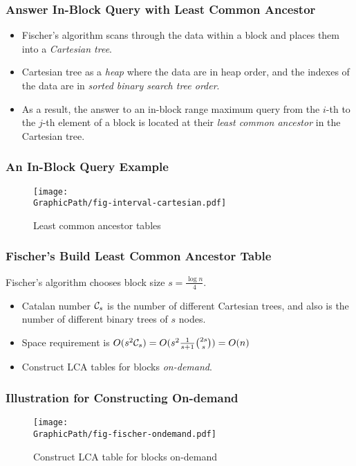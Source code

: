 \begin{frame}
	\frametitle{Answer In-Block Query with Least Common Ancestor}
	\begin{itemize}
		\setlength\itemsep{1em}
		\item
			Fischer's algorithm scans through the data within a block
			and places them into a {\em Cartesian tree}.
		\item
			Cartesian tree as a {\em heap} where the data are in heap
			order, and the indexes of the data are in {\em sorted binary
			search tree order}.
		\item 
			As a result, the answer to an in-block range maximum query
			from the $i$-th to the $j$-th element of a block is located
			at their {\em least common ancestor} in the Cartesian tree.
	\end{itemize}
\end{frame}

\begin{frame}
	\frametitle{An In-Block Query Example}
	\begin{figure}[htbp]   
	  \centering
	  \texttt{[image: \\GraphicPath/fig-interval-cartesian.pdf]}
	  \caption{Least common ancestor tables}
	  \label{fig:ancesstor-cartesian}
	\end{figure}
\end{frame}

\begin{frame}
	\frametitle{Fischer's Build Least Common Ancestor Table}
	Fischer's algorithm chooses block size $s=\frac{\log n}{4}$.
	\begin{itemize}
		\setlength\itemsep{1em}
		\item 
			Catalan number ${\cal C}_s$ is the number of different Cartesian
			trees, and also is the number of different binary trees of
			$s$ nodes.
		\item
			Space requirement is
			$O(s^2{\cal C}_s)=O(s^2\frac{1}{s+1}\binom{2s}{s})=O(n)$
		\item
			Construct LCA tables for blocks {\em on-demand}.
	\end{itemize}
\end{frame}

\begin{withoutheadline}
\begin{frame}
	\frametitle{Illustration for Constructing On-demand}
	\begin{figure}[htbp]   
	  \centering
	  \texttt{[image: \\GraphicPath/fig-fischer-ondemand.pdf]}
	  \caption{Construct LCA table for blocks on-demand}
	  \label{fig:ancesstor-cartesian}
	\end{figure}
\end{frame}
\end{withoutheadline}


